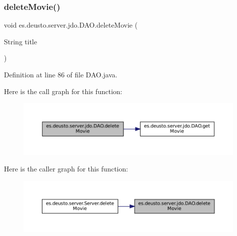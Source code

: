 \subsubsection{\texorpdfstring{deleteMovie()}{deleteMovie()}\hspace{0.1cm}{\footnotesize\ttfamily [1/2]}}
{\footnotesize\ttfamily void es.\+deusto.\+server.\+jdo.\+D\+A\+O.\+delete\+Movie (\begin{DoxyParamCaption}\item[{String}]{title }\end{DoxyParamCaption})}



Definition at line 86 of file D\+A\+O.\+java.

Here is the call graph for this function\+:
\nopagebreak
\begin{figure}[H]
\begin{center}
\leavevmode
\includegraphics[width=350pt]{classes_1_1deusto_1_1server_1_1jdo_1_1_d_a_o_a9bcf552682ef562673a7c725d003debf_cgraph}
\end{center}
\end{figure}
Here is the caller graph for this function\+:
\nopagebreak
\begin{figure}[H]
\begin{center}
\leavevmode
\includegraphics[width=350pt]{classes_1_1deusto_1_1server_1_1jdo_1_1_d_a_o_a9bcf552682ef562673a7c725d003debf_icgraph}
\end{center}
\end{figure}
\mbox{\label{classes_1_1deusto_1_1server_1_1jdo_1_1_d_a_o_a479ca9a8597aada4e74445699140e0fd}} 
